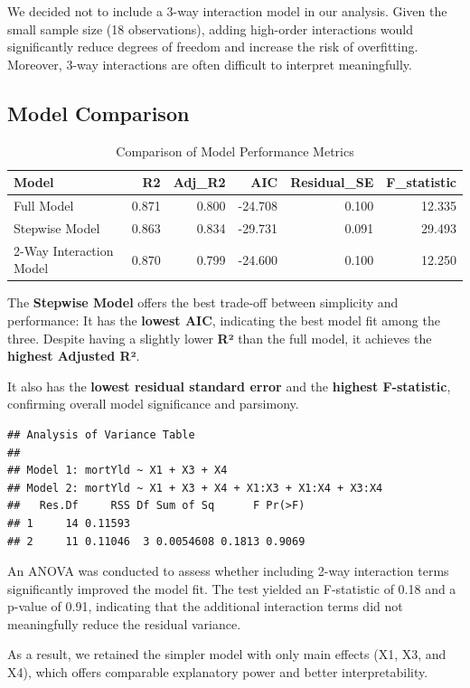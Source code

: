 \documentclass[
  11pt,
]{article}
\begin{document}
We decided not to include a 3-way interaction model in our analysis.
Given the small sample size (18 observations), adding high-order
interactions would significantly reduce degrees of freedom and increase
the risk of overfitting. Moreover, 3-way interactions are often
difficult to interpret meaningfully.

\subsection{Model Comparison}\label{model-comparison}

\begin{longtable}[t]{lrrrrr}
\caption{\label{tab:unnamed-chunk-14}Comparison of Model Performance Metrics}\\
\toprule
Model & R2 & Adj\_R2 & AIC & Residual\_SE & F\_statistic\\
\midrule
Full Model & 0.871 & 0.800 & -24.708 & 0.100 & 12.335\\
Stepwise Model & 0.863 & 0.834 & -29.731 & 0.091 & 29.493\\
2-Way Interaction Model & 0.870 & 0.799 & -24.600 & 0.100 & 12.250\\
\bottomrule
\end{longtable}

The \textbf{Stepwise Model} offers the best trade-off between simplicity
and performance: It has the \textbf{lowest AIC}, indicating the best
model fit among the three. Despite having a slightly lower \textbf{R²}
than the full model, it achieves the \textbf{highest Adjusted R²}.

It also has the \textbf{lowest residual standard error} and the
\textbf{highest F-statistic}, confirming overall model significance and
parsimony.

\begin{verbatim}
## Analysis of Variance Table
## 
## Model 1: mortYld ~ X1 + X3 + X4
## Model 2: mortYld ~ X1 + X3 + X4 + X1:X3 + X1:X4 + X3:X4
##   Res.Df     RSS Df Sum of Sq      F Pr(>F)
## 1     14 0.11593                           
## 2     11 0.11046  3 0.0054608 0.1813 0.9069
\end{verbatim}

An ANOVA was conducted to assess whether including 2-way interaction
terms significantly improved the model fit. The test yielded an
F-statistic of 0.18 and a p-value of 0.91, indicating that the
additional interaction terms did not meaningfully reduce the residual
variance.

As a result, we retained the simpler model with only main effects (X1,
X3, and X4), which offers comparable explanatory power and better
interpretability.
\end{document}
